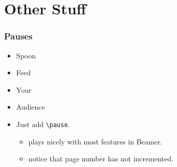 \documentclass[12pt]{beamer}
\begin{document}
\section{Other Stuff}
\begin{frame}[fragile]
\frametitle{Pauses}

\begin{itemize}
\item{Spoon}
\pause
\item{Feed}
\pause
\item{Your}
\pause
\item{Audience}
\pause
\item Just add \texttt{\textbackslash pause}.
\pause
\begin{itemize}
\item plays nicely with most features in Beamer.
\pause
\item notice that page number has not incremented.
\end{itemize}
\end{itemize}

\end{frame}
\end{document}
